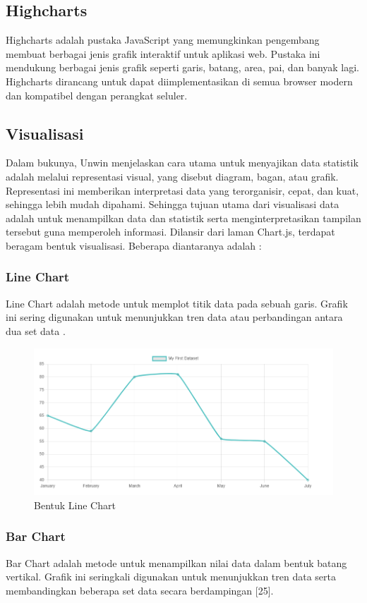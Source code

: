 \subsection{Highcharts}
Highcharts adalah pustaka JavaScript yang memungkinkan pengembang membuat berbagai jenis grafik interaktif untuk aplikasi web. Pustaka ini mendukung berbagai jenis grafik seperti garis, batang, area, pai, dan banyak lagi. Highcharts dirancang untuk dapat diimplementasikan di semua browser modern dan kompatibel dengan perangkat seluler\cite{Highcharts}.

\subsection{Visualisasi}
Dalam bukunya, Unwin \cite{Unwin2020} menjelaskan cara utama untuk menyajikan data statistik adalah melalui representasi visual, yang disebut diagram, bagan, atau grafik. Representasi ini memberikan interpretasi data yang terorganisir, cepat, dan kuat, sehingga lebih mudah dipahami. Sehingga tujuan utama dari visualisasi data adalah untuk menampilkan data dan statistik serta menginterpretasikan tampilan tersebut guna memperoleh informasi. Dilansir dari laman Chart.js, terdapat beragam bentuk visualisasi. Beberapa diantaranya adalah : 

\subsubsection{Line Chart}
Line Chart adalah metode untuk memplot titik data pada sebuah garis. Grafik ini sering digunakan untuk menunjukkan tren data atau perbandingan antara dua set data \cite{ChartJs}.

\begin{figure}[H]
	\centering
	\includegraphics[width=0.8\linewidth]{gambar/Dasar teori/LineChart.png}
	\caption{Bentuk Line Chart}
	\label{gambar1}
\end{figure}

\subsubsection{Bar Chart}
Bar Chart adalah metode untuk menampilkan nilai data dalam bentuk batang vertikal. Grafik ini seringkali digunakan untuk menunjukkan tren data serta membandingkan beberapa set data secara berdampingan [25].

